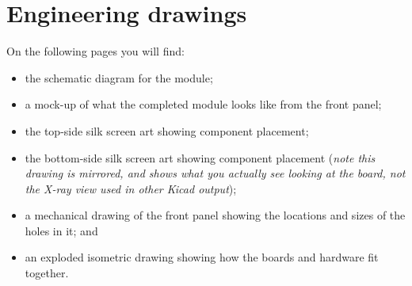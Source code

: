 
%
%
%
%
%
%

\chapter{Engineering drawings}

On the following pages you will find:
\begin{itemize}
  \item the schematic diagram for the module;
  \item a mock-up of what the completed module looks like from the front
    panel;
  \item the top-side silk screen art showing component placement;
  \item the bottom-side silk screen art showing component placement
    (\emph{note this drawing is mirrored, and shows what you actually see
    looking at the board, not the X-ray view used in other Kicad output});
  \item a mechanical drawing of the front panel showing the locations and
    sizes of the holes in it; and
  \item an exploded isometric drawing showing how the boards and hardware
    fit together.
\end{itemize}

\texdependspdfworkaround

\clearpage


\thispagestyle{empty}
\onecolumn
\vspace*{\fill}\begin{center}
\setlength{\fboxsep}{0pt}%
\setlength{\fboxrule}{1pt}%
\end{center}
\vspace*{\fill}

\clearpage




